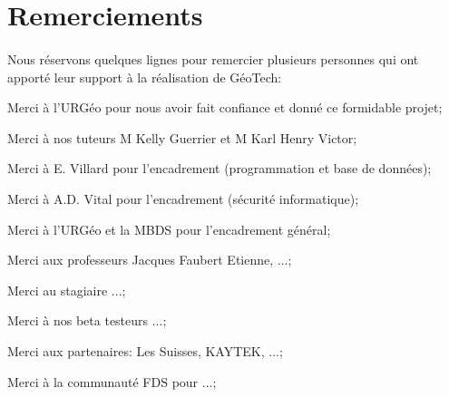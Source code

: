 \section{Remerciements}
\paragraph{}
Nous réservons quelques lignes pour remercier plusieurs personnes qui ont apporté leur support à la réalisation de GéoTech:\par
Merci à l'URGéo pour nous avoir fait confiance et donné ce formidable projet;\par
Merci à nos tuteurs M Kelly Guerrier et M Karl Henry Victor;\par
Merci à  E. Villard pour l'encadrement (programmation et base de données);\par
Merci à A.D. Vital pour l'encadrement (sécurité informatique);\par
Merci à l'URGéo et la MBDS pour l'encadrement général;\par
Merci aux professeurs Jacques Faubert Etienne, ...;\par
Merci au stagiaire ...;\par
Merci à nos beta testeurs ...;\par
Merci aux partenaires: Les Suisses, KAYTEK, ...;\par
Merci à la communauté FDS pour ...;\par
